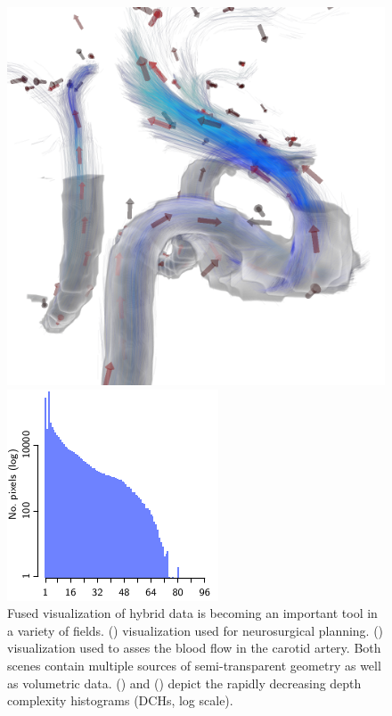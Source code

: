 \documentclass{egpubl}
\newcommand{\dch}{DCH}
\begin{document}
\begin{figure}[p]
\begin{minipage}[b]{0.26\linewidth}
    \includegraphics[width=0.98\linewidth]{snapshots/flow/cgf/screenshot_Flow}
  \end{minipage}\hfill
  \begin{minipage}[b]{0.22\linewidth}\centering
    \includegraphics{figures/plot-dch-flow}
  \end{minipage}
  \caption{\label{fig:neuro-flow}%
    Fused visualization of hybrid data is becoming an important tool in a variety of fields. 
    () visualization used for neurosurgical planning.
    () visualization used to asses the blood flow in the carotid artery. 
    Both scenes contain multiple sources of semi-transparent geometry as well as volumetric data. 
    () and () depict the rapidly decreasing depth complexity histograms (\dch{}s, log scale). %
  }
\end{figure}
\end{document}
